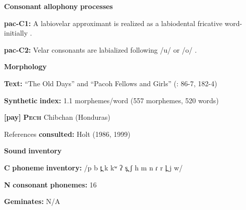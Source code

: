 \begin{styleBody}
\textbf{Consonant} \textbf{allophony} \textbf{processes}
\end{styleBody}

\begin{styleBody}
\textbf{pac-C1:} A labiovelar approximant is realized as a labiodental fricative word-initially \citep[11]{Alves2006}.
\end{styleBody}

\begin{styleBody}
\textbf{pac-C2:} Velar consonants are labialized following /u/ or /o/ \citep[12]{Alves2006}.
\end{styleBody}

\begin{styleBody}
\textbf{Morphology}
\end{styleBody}

\begin{styleBody}
\textbf{Text:} “The Old Days” and “Pacoh Fellows and Girls” (\citealt{Watson1980}: 86-7, 182-4)
\end{styleBody}

\begin{styleBody}
\textbf{Synthetic} \textbf{index:} 1.1 morphemes/word (557 morphemes, 520 words)
\end{styleBody}

\begin{styleBody}
\textbf{[pay]}   \textbf{\textsc{Pech}}  Chibchan (Honduras)
\end{styleBody}

\begin{styleBody}
References \textbf{consulted:} Holt (1986, 1999)
\end{styleBody}

\begin{styleBody}
\textbf{Sound} \textbf{inventory}
\end{styleBody}

\begin{styleBody}
\textbf{C} \textbf{phoneme} \textbf{inventory:} /p b t̪ k kʷ ʔ s̪ ʃ h m n ɾ r l̪ j w/
\end{styleBody}

\begin{styleBody}
\textbf{N} \textbf{consonant} \textbf{phonemes:} 16
\end{styleBody}

\begin{styleBody}
\textbf{Geminates:} N/A
\end{styleBody}

